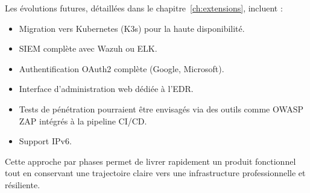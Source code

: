 Les évolutions futures, détaillées dans le chapitre~\ref{ch:extensions},
incluent :

\begin{itemize}
  \item Migration vers Kubernetes (K3s) pour la haute disponibilité.
  \item SIEM complète avec Wazuh ou ELK.
  \item Authentification OAuth2 complète (Google, Microsoft).
  \item Interface d'administration web dédiée à l'EDR.
  \item Tests de pénétration pourraient être envisagés via des outils
    comme OWASP ZAP intégrés à la pipeline CI/CD.
  \item Support IPv6.
\end{itemize}

Cette approche par phases permet de livrer rapidement un produit
fonctionnel tout en conservant une trajectoire claire vers une
infrastructure professionnelle et résiliente.

\endinput

